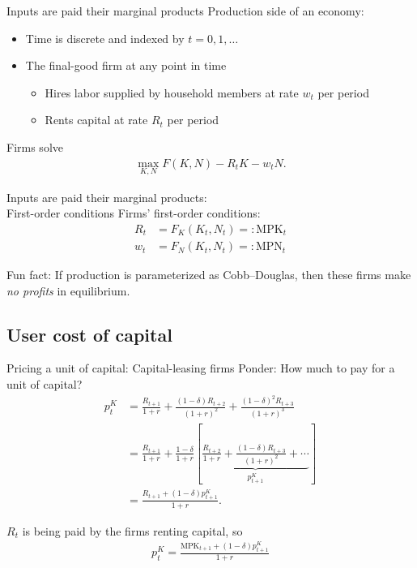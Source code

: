 \documentclass[presentation,dvipsnames]{beamer}
\begin{document}
\begin{frame}[label=sec-2-7]{Inputs are paid their marginal products}
Production side of an economy:
\begin{itemize}[label={--}]
\item Time is discrete and indexed by $t=0,1,\dots$
\item The final-good firm at any point in time
\begin{itemize}[label={--}]
\item Hires labor supplied by household members at rate $w_{t}$ per period
\item Rents capital at rate $R_{t}$ per period 
\end{itemize}
\end{itemize}

Firms solve
\begin{align*}
\max_{K,N} F(K,N) - R_{t}K - w_{t}N.
\end{align*}
\end{frame}

\begin{frame}[label=sec-2-7]{Inputs are paid their marginal products: \\ First-order conditions}
Firms' first-order conditions:
\begin{align*}
R_{t} &= F_{K}(K_{t},N_{t}) =: \text{MPK}_{t} \\
w_{t} &= F_{N}(K_{t},N_{t}) =: \text{MPN}_{t}
\end{align*}

\textcolor{RubineRed}{Fun fact}: If production is parameterized as Cobb--Douglas,
then these firms make \emph{no profits} in equilibrium.
\end{frame}

\subsection{User cost of capital}
\begin{frame}[label=sec-2-8]{Pricing a unit of capital: Capital-leasing firms}
Ponder: How much to pay for a unit of capital?
\begin{align*}
p_{t}^{K} &= \frac{R_{t+1}}{1+r} + \frac{(1-\delta)R_{t+2}}{(1+r)^{2}} +
\frac{(1-\delta)^{2}R_{t+3}}{(1+r)^{3}} \\
&= \frac{R_{t+1}}{1+r} + \frac{1-\delta}{1+r} \left[
\underbrace{\frac{R_{t+2}}{1+r} + \frac{(1-\delta)R_{t+3}}{(1+r)^{2}} + \cdots}_{p_{t+1}^{K}}
\right] \\
&= \frac{R_{t+1} + (1-\delta)p_{t+1}^{K}}{1+r}.
\end{align*}

$R_{t}$ is being paid by the firms renting capital, so
\begin{align*}
p_{t}^{K} = \frac{\text{MPK}_{t+1} + (1-\delta)p_{t+1}^{K}}{1+r}
\end{align*}
\end{frame}
\end{document}
